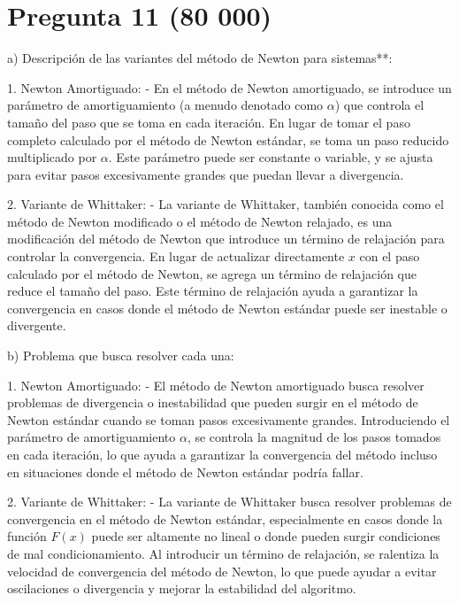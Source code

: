 \documentclass[a4paper,12pt]{article}
\begin{document}
\section*{Pregunta 11 (80 000)}
a) Descripción de las variantes del método de Newton para sistemas**:

1. Newton Amortiguado:
   - En el método de Newton amortiguado, se introduce un parámetro de amortiguamiento (a menudo denotado como \( \alpha \)) que controla el tamaño del paso que se toma en cada iteración. En lugar de tomar el paso completo calculado por el método de Newton estándar, se toma un paso reducido multiplicado por \( \alpha \). Este parámetro puede ser constante o variable, y se ajusta para evitar pasos excesivamente grandes que puedan llevar a divergencia.
   
2. Variante de Whittaker:
   - La variante de Whittaker, también conocida como el método de Newton modificado o el método de Newton relajado, es una modificación del método de Newton que introduce un término de relajación para controlar la convergencia. En lugar de actualizar directamente \( x \) con el paso calculado por el método de Newton, se agrega un término de relajación que reduce el tamaño del paso. Este término de relajación ayuda a garantizar la convergencia en casos donde el método de Newton estándar puede ser inestable o divergente.

b) Problema que busca resolver cada una:

1. Newton Amortiguado:
   - El método de Newton amortiguado busca resolver problemas de divergencia o inestabilidad que pueden surgir en el método de Newton estándar cuando se toman pasos excesivamente grandes. Introduciendo el parámetro de amortiguamiento \( \alpha \), se controla la magnitud de los pasos tomados en cada iteración, lo que ayuda a garantizar la convergencia del método incluso en situaciones donde el método de Newton estándar podría fallar.

2. Variante de Whittaker:
   - La variante de Whittaker busca resolver problemas de convergencia en el método de Newton estándar, especialmente en casos donde la función \( F(x) \) puede ser altamente no lineal o donde pueden surgir condiciones de mal condicionamiento. Al introducir un término de relajación, se ralentiza la velocidad de convergencia del método de Newton, lo que puede ayudar a evitar oscilaciones o divergencia y mejorar la estabilidad del algoritmo.
\end{document}
